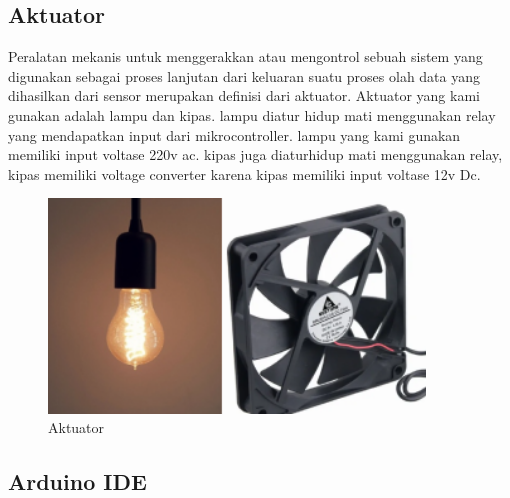 \subsection{Aktuator}
    Peralatan mekanis untuk menggerakkan atau mengontrol sebuah sistem yang digunakan sebagai proses lanjutan dari keluaran suatu proses olah data yang dihasilkan dari sensor merupakan definisi dari aktuator\cite{aktuator}. Aktuator yang kami gunakan adalah lampu dan kipas. lampu diatur hidup mati menggunakan relay yang mendapatkan input dari mikrocontroller. lampu yang kami gunakan memiliki input voltase 220v ac. kipas juga diaturhidup mati menggunakan relay, kipas memiliki voltage converter karena kipas memiliki input voltase 12v Dc.
    \begin{figure}[H]
        \centering
        \includegraphics[width=10cm]{image/aktuator.png}
        \caption{Aktuator}
        \label{fig:aktuator}
    \end{figure}

\subsection{Arduino IDE}


